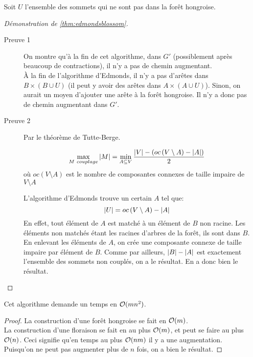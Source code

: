 \documentclass[math, info]{cours}
\begin{document}
Soit $U$ l'ensemble des sommets qui ne sont pas dans la forêt hongroise.

\begin{proof}[Démonstration de \ref{thm:edmondsblossom}]
	\begin{description}
		\item[Preuve 1] On montre qu'à la fin de cet algorithme, dans $G'$ (possiblement après beaucoup de contractions), il n'y a pas de chemin augmentant.\\
				À la fin de l'algorithme d'Edmonds, il n'y a pas d'arêtes dans $B \times \left(B \cup U \right)$ (il peut y avoir des arêtes dans $A \times \left( A\cup U \right)$).
				Sinon, on aurait un moyen d'ajouter une arête à la forêt hongroise.
				Il n'y a donc pas de chemin augmentant dans $G'$.
		 \item[Preuve 2] Par le théorème de Tutte-Berge.
			 \begin{thm}
				 \begin{equation*}
				 	\max_{M \ couplage} \left|M\right| = \min_{A \subseteq V}\frac{\left|V\right| - \left(oc\left(V \setminus A \right) - \left|A\right| \right)}{2}
				\end{equation*}
				où $oc(V \setminus A)$ est le nombre de composantes connexes de taille impaire de $V \setminus A$
			 \end{thm}
			 L'algorithme d'Edmonds trouve un certain $A$ tel que:
			 \begin{equation*}
				 \left|U\right| = oc\left(V\setminus A \right) - \left|A\right|
			 \end{equation*}
			 En effet, tout élément de $A$ est matché à un élément de $B$ non racine.
			 Les éléments non matchés étant les racines d'arbres de la forêt, ils sont dans $B$.
			 En enlevant les éléments de $A$, on crée une composante connexe de taille impaire par élément de $B$.
			 Comme par ailleurs, $\left|B\right| - \left|A\right|$ est exactement l'ensemble des sommets non couplés, on a le résultat.
			 En a donc bien le résultat.
	\end{description}
\end{proof}

\begin{thm}
	Cet algorithme demande un temps en $\mathcal{O}(mn^{2})$.
	\label{prop:edmondsblossomtimecomplexity}
\end{thm}
\begin{proof}
	La construction d'une forêt hongroise se fait en $\mathcal{O}(m)$.\\
	La construction d'une floraison se fait en au plus $\mathcal{O}(m)$, et peut se faire au plus $\mathcal{O}(n)$.
	Ceci signifie qu'en temps au plus $\mathcal{O}(nm)$ il y a une augmentation.
	Puisqu'on ne peut pas augmenter plus de $n$ fois, on a bien le résultat.
\end{proof}
\end{document}
